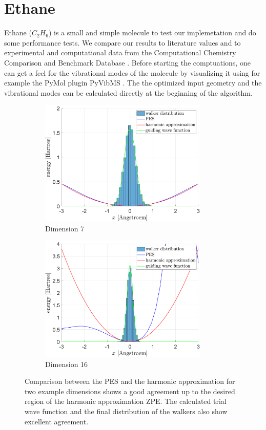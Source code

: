 \documentclass [12pt]{report}
\begin{document}
\section{Ethane}
Ethane ($C_2H_6$) is a small and simple molecule to test our implemetation and do some performance tests. We compare our results to literature values\cite{c2h6} and to experimental and computational data from the Computational Chemistry Comparison and Benchmark Database \cite{cccbdb}. Before starting the comptuations, one can get a feel for the vibrational modes of the molecule by visualizing it using for example the PyMol plugin PyVibMS \cite{PyVibMS}. The the optimized input geometry and the vibrational modes can be calculated directly at the beginning of the algorithm. 

\begin{figure}[h]
\begin{subfigure}{0.5\textwidth}
\includegraphics[width=0.9\linewidth, height=6cm]{walkers1.png} 
\caption{Dimension 7}
\label{dim7}
\end{subfigure}
\begin{subfigure}{0.5\textwidth}
\includegraphics[width=0.9\linewidth, height=6cm]{walkers2.png}
\caption{Dimension 16}
\label{dim16}
\end{subfigure}
\caption{Comparison between the PES and the harmonic approximation for two example dimensions shows a good agreement up to the desired region of the harmonic approximation ZPE. The calculated trial wave function and the final distribution of the walkers also show excellent agreement.}
\label{trialwf}
\end{figure}
\end{document}
